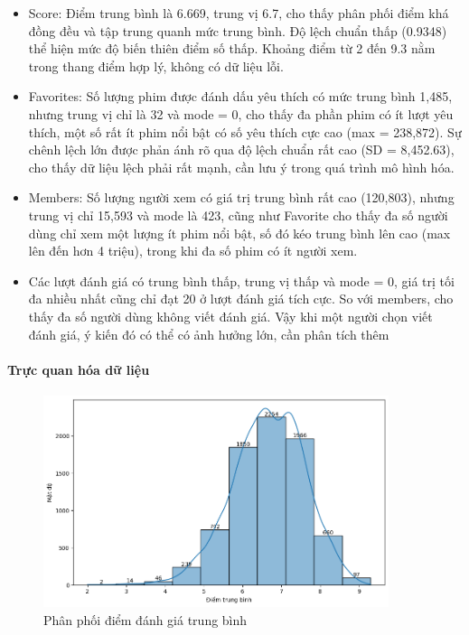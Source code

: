     \begin{itemize}
        \item Score: Điểm trung bình là 6.669, trung vị 6.7, cho thấy phân phối điểm khá đồng đều và tập trung quanh mức trung bình. Độ lệch chuẩn thấp (0.9348) thể hiện mức độ biến thiên điểm số thấp. Khoảng điểm từ 2 đến 9.3 nằm trong thang điểm hợp lý, không có dữ liệu lỗi. 
        
        \item Favorites: Số lượng phim được đánh dấu yêu thích có mức trung bình 1,485, nhưng trung vị chỉ là 32 và mode = 0, cho thấy đa phần phim có ít lượt yêu thích, một số rất ít phim nổi bật có số yêu thích cực cao (max = 238,872). Sự chênh lệch lớn được phản ánh rõ qua độ lệch chuẩn rất cao (SD = 8,452.63), cho thấy dữ liệu lệch phải rất mạnh, cần lưu ý trong quá trình mô hình hóa.
        
        \item Members: Số lượng người xem có giá trị trung bình rất cao (120,803), nhưng trung vị chỉ 15,593 và mode là 423, cũng như Favorite cho thấy đa số người dùng chỉ xem một lượng ít phim nổi bật, số đó kéo trung bình lên cao (max lên đến hơn 4 triệu), trong khi đa số phim có ít người xem.
        
        \item Các lượt đánh giá có trung bình thấp, trung vị thấp và mode = 0, giá trị tối đa nhiều nhất cũng chỉ đạt 20 ở lượt đánh giá tích cực. So với members, cho thấy đa số người dùng không viết đánh giá. Vậy khi một người chọn viết đánh giá, ý kiến đó có thể có ảnh hưởng lớn, cần phân tích thêm
    \end{itemize}

    \paragraph{Trực quan hóa dữ liệu}
    \leavevmode

    \begin{figure}[htp]
        \centering
        \includegraphics[width=0.90\textwidth]{images/Table_MAL_score.png}
        \caption{Phân phối điểm đánh giá trung bình }
        \label{fig:Table_MAL_score}
    \end{figure}

